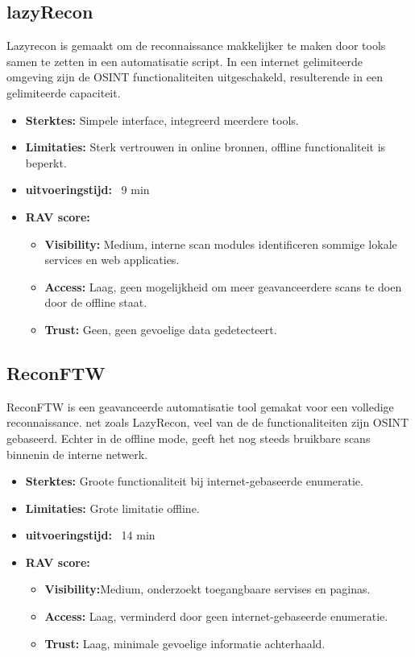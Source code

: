 \subsection{lazyRecon}
Lazyrecon is gemaakt om de reconnaissance makkelijker te maken door tools samen te zetten in een automatisatie script. 
In een internet gelimiteerde omgeving zijn de OSINT functionaliteiten uitgeschakeld, resulterende in een gelimiteerde capaciteit.

\begin{itemize}
  \item \textbf{Sterktes:} Simpele interface, integreerd meerdere tools.
  \item \textbf{Limitaties:} Sterk vertrouwen in online bronnen, offline functionaliteit is beperkt. 
  \item \textbf{uitvoeringstijd:} ~9 min
  \item \textbf{RAV score:}
    \small{
    \begin{itemize}
      \item \textbf{Visibility:} Medium, interne scan modules identificeren sommige lokale services en web applicaties.
      \item \textbf{Access:} Laag, geen mogelijkheid om meer geavanceerdere scans te doen door de offline staat.
      \item \textbf{Trust:} Geen, geen gevoelige data gedetecteert. 
    \end{itemize}
    }
\end{itemize}

\subsection{ReconFTW}

ReconFTW is een geavanceerde automatisatie tool gemakat voor een volledige reconnaissance. net zoals LazyRecon, veel van de de functionaliteiten zijn OSINT gebaseerd. 
Echter in de offline mode, geeft het nog steeds bruikbare scans binnenin de interne netwerk.

\begin{itemize}
  \item \textbf{Sterktes:} Groote functionaliteit bij internet-gebaseerde enumeratie.
  \item \textbf{Limitaties:} Grote limitatie offline.
  \item \textbf{uitvoeringstijd:} ~14 min
  \item \textbf{RAV score:} 
    \small{
    \begin{itemize}
      \item \textbf{Visibility:}Medium, onderzoekt toegangbaare servises en paginas.
      \item \textbf{Access:} Laag, verminderd door geen internet-gebaseerde enumeratie.
      \item \textbf{Trust:} Laag, minimale gevoelige informatie achterhaald. 
    \end{itemize}
    }
\end{itemize}

